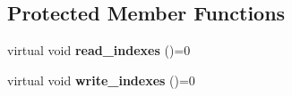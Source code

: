 \subsection*{Protected Member Functions}
\begin{DoxyCompactItemize}
\item 
\mbox{\label{classtime__series_1_1internal_1_1TimeSeriesBase_a1f379b0886fe36f5a7ea99ebb56a3bbf}} 
virtual void {\bfseries read\+\_\+indexes} ()=0
\item 
\mbox{\label{classtime__series_1_1internal_1_1TimeSeriesBase_ae45f307ebdfe4508fa342a6a259aea38}} 
virtual void {\bfseries write\+\_\+indexes} ()=0
\end{DoxyCompactItemize}
